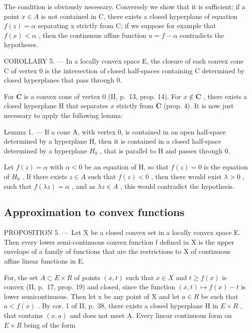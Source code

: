 The condition is obviously necessary. Conversely we show that it is sufficient; if a point \(x \in A\) is not contained in C, there exists a closed hyperplane of equation \(f(z) = \alpha\) separating x strictly from C; if we suppose for example that \(f(x) < \alpha\) , then the continuous affine function \(u = f - \alpha\) contradicts the hypotheses.

COROLLARY 5. --- In a locally convex space E, the closure of each convex cone C of vertex 0 is the intersection of closed half-spaces containing C determined by closed hyperplanes that pass through 0.

For \(\overline{\mathbf{C}}\) is a convex cone of vertex 0 (II, p.~13, prop. 14). For \(x \notin \overline{\mathbf{C}}\) , there exists a closed hyperplane H that separates \(x\) strictly from \(\overline{\mathbf{C}}\) (prop. 4). It is now just necessary to apply the following lemma:

Lemma 1. --- If a cone A, with vertex 0, is contained in an open half-space determined by a hyperplane H, then it is contained in a closed half-space determined by a hyperplane \(H_{0}\) , that is parallel to H and passes through 0.

Let \(f(z) = \alpha\) with \(\alpha < 0\) be an equation of H, so that \(f(z) = 0\) is the equation of \(H_0\) . If there exists \(z \in A\) such that \(f(z) < 0\) , then there would exist \(\lambda > 0\) , such that \(f(\lambda z) = \alpha\) , and as \(\lambda z \in A\) , this would contradict the hypothesis.

\subsection{Approximation to convex functions}

PROPOSITION 5. --- Let X be a closed convex set in a locally convex space E. Then every lower semi-continuous convex function f defined in X is the upper envelope of a family of functions that are the restrictions to X of continuous affine linear functions in E.

For, the set \(A \subset E \times R\) of points \((x, t)\) such that \(x \in X\) and \(t \geqslant f(x)\) is convex (II, p.~17, prop. 19) and closed, since the function \((x, t) \mapsto f(x) - t\) is lower semicontinuous. Then let x be any point of X and let \(a \in R\) be such that \(a < f(x)\) . By cor. 1 of II, p.~38, there exists a closed hyperplane H in \(E \times R\) , that contains \((x, a)\) and does not meet A. Every linear continuous form on \(E \times R\) being of the form

